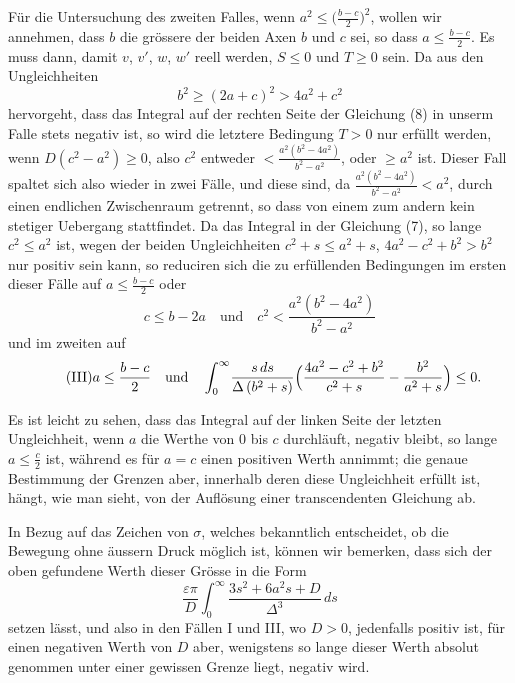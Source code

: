 \documentclass[12pt,a4paper]{book}
\theoremstyle{definition}
\theoremstyle{remark}
\begin{document}
Für die Untersuchung des zweiten Falles, wenn $a^2 \leq \bigl(\frac{b-c}{2}\bigr)^2$, wollen wir annehmen, dass $b$ die grössere der beiden Axen $b$ und $c$ sei, so dass $a \leq \frac{b-c}{2}$. Es muss dann, damit $v$, $v'$, $w$, $w'$ reell werden, $S \leq 0$ und $T \geq 0$ sein. Da aus den Ungleichheiten
\[ b^2 \geq (2a+c)^2 > 4a^2 + c^2 \]
hervorgeht, dass das Integral auf der rechten Seite der Gleichung (8) in unserm Falle stets negativ ist, so wird die letztere Bedingung $T > 0$ nur erfüllt werden, wenn $D(c^2 - a^2) \geq 0$, also $c^2$ entweder $< \frac{a^2(b^2 - 4a^2)}{b^2 - a^2}$, oder $\geq a^2$ ist. Dieser Fall spaltet sich also wieder in zwei Fälle, und diese sind, da $\frac{a^2(b^2-4a^2)}{b^2-a^2} < a^2$, durch einen endlichen Zwischenraum getrennt, so dass von einem zum andern kein stetiger Uebergang stattfindet. Da das Integral in der Gleichung (7), so lange $c^2 \leq a^2$ ist, wegen der beiden Ungleichheiten $c^2 + s \leq a^2 + s$, $4a^2 - c^2 + b^2 > b^2$ nur positiv sein kann, so reduciren sich die zu erfüllenden Bedingungen im ersten dieser Fälle auf $a \leq \frac{b-c}{2}$ oder
\begin{equation}
\tag{II} c \leq b - 2a \quad\text{und}\quad c^2 < \frac{a^2(b^2 - 4a^2)}{b^2 - a^2} \end{equation}
und im zweiten auf
\begin{equation}
\tag{III} a \leq \frac{b-c}{2} \quad\text{und}\quad \int_0^{\infty}\!\frac{s\,ds}{\Delta\,(b^2+s)}\Bigl(\frac{4a^2 - c^2 + b^2}{c^2+s} - \frac{b^2}{a^2+s}\Bigr) \leq 0. \end{equation}

Es ist leicht zu sehen, dass das Integral auf der linken Seite der letzten Ungleichheit, wenn $a$ die Werthe von $0$ bis $c$ durchläuft, negativ bleibt, so lange $a \leq \frac{c}{2}$ ist, während es für $a = c$ einen positiven Werth annimmt; die genaue Bestimmung der Grenzen aber, innerhalb deren diese Ungleichheit erfüllt ist, hängt, wie man sieht, von der Auflösung einer transcendenten Gleichung ab.

In Bezug auf das Zeichen von $\sigma$, welches bekanntlich entscheidet, ob die Bewegung ohne äussern Druck möglich ist, können wir bemerken, dass sich der oben gefundene Werth dieser Grösse in die Form
\[ \frac{\varepsilon\pi}{D}\int_0^{\infty}\!\frac{3s^2 + 6a^2s + D}{\Delta^3}\,ds \]
setzen lässt, und also in den Fällen I und III, wo $D > 0$, jedenfalls positiv ist, für einen negativen Werth von $D$ aber, wenigstens so lange dieser Werth absolut genommen unter einer gewissen Grenze liegt, negativ wird.
\end{document}
